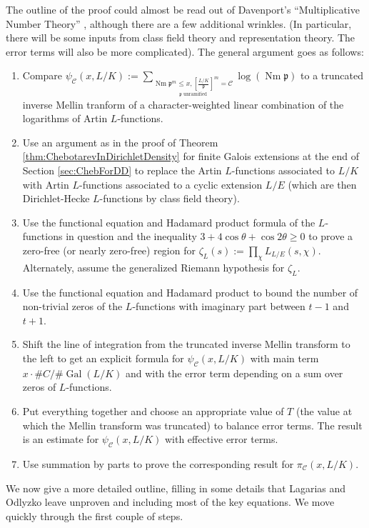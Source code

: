 \documentclass[12pt]{amsart}
\theoremstyle{definition}
\theoremstyle{remark}
\numberwithin{equation}{section}
\newcommand{\cC}{\mathcal C}
\newcommand{\fkp}{\mathfrak p}
\DeclareMathOperator{\norm}{Nm}
\newcommand{\artin}[2]{\left[ \frac{#1}{#2}\right]}
\DeclareMathOperator{\Gal}{Gal}
\begin{document}
The outline of the proof could almost be read out of Davenport's ``Multiplicative Number Theory'' \cite{Davenport00}, although there are a few additional wrinkles. (In particular, there will be some inputs from class field theory and representation theory. The error terms will also be more complicated). The general argument goes as follows:
\begin{enumerate}
\item Compare $\psi_{\cC}(x, L/K) := \sum_{\underset{\fkp \text{ unramified}}{\norm \fkp^{m} \leq x, \artin{L/K}{\fkp}^{m} = \cC}} \log(\norm \fkp)$ to a truncated inverse Mellin tranform of a character-weighted linear combination of the logarithms of Artin $L$-functions.
\item Use an argument as in the proof of Theorem \ref{thm:ChebotarevInDirichletDensity} for finite Galois extensions at the end of Section \ref{sec:ChebForDD} to replace the Artin $L$-functions associated to $L/K$ with Artin $L$-functions associated to a cyclic extension $L/E$ (which are then Dirichlet-Hecke $L$-functions by class field theory).
\item Use the functional equation and Hadamard product formula of the $L$-functions in question and the inequality $3 + 4 \cos \theta + \cos 2\theta \geq 0$ to prove a zero-free (or nearly zero-free) region for $\zeta_{L}(s) := \prod_{\chi} L_{L/E}(s,\chi)$. Alternately, assume the generalized Riemann hypothesis for $\zeta_{L}$.
\item Use the functional equation and Hadamard product to bound the number of non-trivial zeros of the $L$-functions with imaginary part between $t-1$ and $t+1$.
\item Shift the line of integration from the truncated inverse Mellin transform to the left to get an explicit formula for $\psi_{\cC}(x,L/K)$ with main term $x \cdot \# C/\# \Gal(L/K)$ and with the error term depending on a sum over zeros of $L$-functions.
\item Put everything together and choose an appropriate value of $T$ (the value at which the Mellin transform was truncated) to balance error terms. The result is an estimate for $\psi_{\cC}(x, L/K)$ with effective error terms.
\item Use summation by parts to prove the corresponding result for $\pi_{\cC}(x, L/K)$.
\end{enumerate}


We now give a more detailed outline, filling in some details that Lagarias and Odlyzko leave unproven and including most of the key equations.
We move quickly through the first couple of steps.
\end{document}
